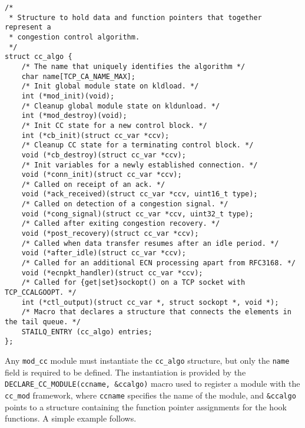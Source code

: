 \begin{code}
\begin{verbatim}
/*
 * Structure to hold data and function pointers that together represent a
 * congestion control algorithm.
 */
struct cc_algo {
    /* The name that uniquely identifies the algorithm */
    char name[TCP_CA_NAME_MAX];
    /* Init global module state on kldload. */
    int	(*mod_init)(void);
    /* Cleanup global module state on kldunload. */
    int (*mod_destroy)(void);
    /* Init CC state for a new control block. */
    int	(*cb_init)(struct cc_var *ccv);
    /* Cleanup CC state for a terminating control block. */
    void (*cb_destroy)(struct cc_var *ccv);
    /* Init variables for a newly established connection. */
    void (*conn_init)(struct cc_var *ccv);
    /* Called on receipt of an ack. */
    void (*ack_received)(struct cc_var *ccv, uint16_t type);
    /* Called on detection of a congestion signal. */
    void (*cong_signal)(struct cc_var *ccv, uint32_t type);
    /* Called after exiting congestion recovery. */
    void (*post_recovery)(struct cc_var *ccv);
    /* Called when data transfer resumes after an idle period. */
    void (*after_idle)(struct cc_var *ccv);
    /* Called for an additional ECN processing apart from RFC3168. */
    void (*ecnpkt_handler)(struct cc_var *ccv);
    /* Called for {get|set}sockopt() on a TCP socket with TCP_CCALGOOPT. */
    int (*ctl_output)(struct cc_var *, struct sockopt *, void *);
    /* Macro that declares a structure that connects the elements in the tail queue. */
    STAILQ_ENTRY (cc_algo) entries;
};
\end{verbatim}
\label{code:freebsd-cc}
\end{code}

Any \lstinline{mod_cc} module must instantiate the \lstinline{cc_algo} structure, but only the \lstinline{name} field is required to be defined. The instantiation is provided by the \lstinline{DECLARE_CC_MODULE(ccname, &ccalgo)} macro used to register a module with the \lstinline{cc_mod} framework, where \lstinline{ccname} specifies the name of the module, and \lstinline{&ccalgo} points to a structure containing the function pointer assignments for the hook functions. A simple example follows.


